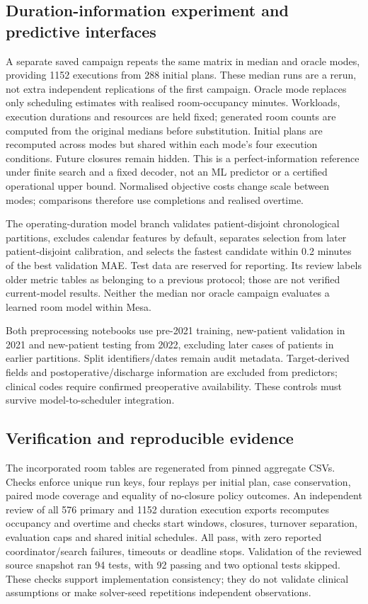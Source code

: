 \subsection{Duration-information experiment and predictive interfaces}
\label{sec:duration-design}

A separate saved campaign repeats the same matrix in median and oracle modes,
providing 1152 executions from 288 initial plans. These median runs are a
rerun, not extra independent replications of the first campaign. Oracle
mode replaces only scheduling estimates with realised room-occupancy minutes.
Workloads, execution durations and resources are held fixed; generated room
counts are computed from the original medians before substitution. Initial
plans are recomputed across modes but shared within each mode's four execution
conditions. Future closures remain hidden. This is a perfect-information
reference under finite search and a fixed decoder, not an ML predictor or a
certified operational upper bound. Normalised objective costs change scale
between modes; comparisons therefore use completions and realised overtime.

The operating-duration model branch \citep{group2026durationmodel} validates
patient-disjoint chronological partitions, excludes calendar features by
default, separates selection from later patient-disjoint calibration, and
selects the fastest candidate within 0.2 minutes of the best validation MAE.
Test data are reserved for reporting. Its review labels older metric tables
as belonging to a previous protocol; those are not verified current-model
results. Neither the median nor oracle campaign evaluates a learned room
model within Mesa.

Both preprocessing notebooks use pre-2021 training, new-patient validation
in 2021 and new-patient testing from 2022, excluding later cases of patients
in earlier partitions. Split identifiers/dates remain audit metadata.
Target-derived fields and postoperative/discharge information are excluded
from predictors; clinical codes require confirmed preoperative availability.
These controls must survive model-to-scheduler integration.

\subsection{Verification and reproducible evidence}

The incorporated room tables are regenerated from pinned aggregate CSVs.
Checks enforce unique run keys, four replays per initial plan, case conservation,
paired mode coverage and equality of no-closure policy outcomes. An independent
review of all 576 primary and 1152 duration execution exports recomputes
occupancy and overtime and checks start windows, closures, turnover separation,
evaluation caps and shared initial schedules. All pass, with zero reported
coordinator/search failures, timeouts or deadline stops. Validation of the reviewed source snapshot ran 94 tests, with 92 passing
and two optional tests skipped. These
checks support implementation consistency; they do not validate clinical
assumptions or make solver-seed repetitions independent observations.
